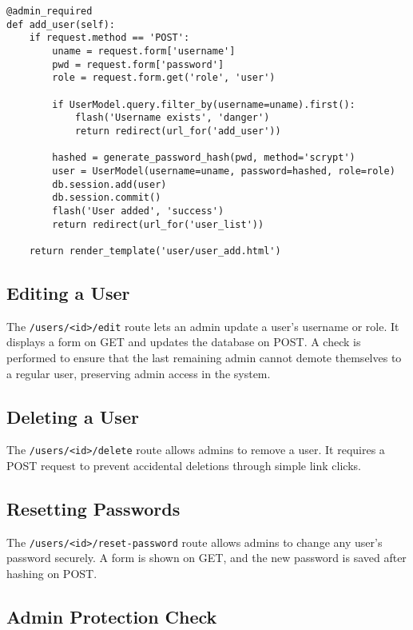 \documentclass[12pt]{article}
\begin{document}
\begin{verbatim}
@admin_required
def add_user(self):
    if request.method == 'POST':
        uname = request.form['username']
        pwd = request.form['password']
        role = request.form.get('role', 'user')

        if UserModel.query.filter_by(username=uname).first():
            flash('Username exists', 'danger')
            return redirect(url_for('add_user'))

        hashed = generate_password_hash(pwd, method='scrypt')
        user = UserModel(username=uname, password=hashed, role=role)
        db.session.add(user)
        db.session.commit()
        flash('User added', 'success')
        return redirect(url_for('user_list'))

    return render_template('user/user_add.html')
\end{verbatim}

\subsection*{Editing a User}

The \texttt{/users/<id>/edit} route lets an admin update a user’s username or role. It displays a form on GET and updates the database on POST. A check is performed to ensure that the last remaining admin cannot demote themselves to a regular user, preserving admin access in the system.

\subsection*{Deleting a User}

The \texttt{/users/<id>/delete} route allows admins to remove a user. It requires a POST request to prevent accidental deletions through simple link clicks.

\subsection*{Resetting Passwords}

The \texttt{/users/<id>/reset-password} route allows admins to change any user's password securely. A form is shown on GET, and the new password is saved after hashing on POST.

\subsection*{Admin Protection Check}
\end{document}
